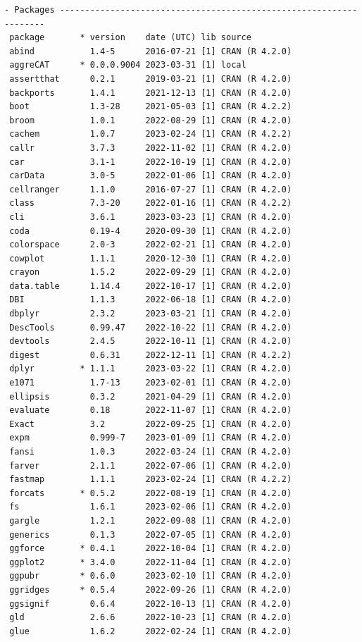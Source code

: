 \documentclass[article]{jss}
\begin{document}
\begin{tcolorbox}[enhanced jigsaw, left=2mm, opacityback=0, leftrule=.75mm, arc=.35mm, rightrule=.15mm, colframe=quarto-callout-color-frame, bottomrule=.15mm, breakable, toprule=.15mm, colback=white]
\begin{verbatim}
- Packages -------------------------------------------------------------------
 package       * version    date (UTC) lib source
 abind           1.4-5      2016-07-21 [1] CRAN (R 4.2.0)
 aggreCAT      * 0.0.0.9004 2023-03-31 [1] local
 assertthat      0.2.1      2019-03-21 [1] CRAN (R 4.2.0)
 backports       1.4.1      2021-12-13 [1] CRAN (R 4.2.0)
 boot            1.3-28     2021-05-03 [1] CRAN (R 4.2.2)
 broom           1.0.1      2022-08-29 [1] CRAN (R 4.2.0)
 cachem          1.0.7      2023-02-24 [1] CRAN (R 4.2.2)
 callr           3.7.3      2022-11-02 [1] CRAN (R 4.2.0)
 car             3.1-1      2022-10-19 [1] CRAN (R 4.2.0)
 carData         3.0-5      2022-01-06 [1] CRAN (R 4.2.0)
 cellranger      1.1.0      2016-07-27 [1] CRAN (R 4.2.0)
 class           7.3-20     2022-01-16 [1] CRAN (R 4.2.2)
 cli             3.6.1      2023-03-23 [1] CRAN (R 4.2.0)
 coda            0.19-4     2020-09-30 [1] CRAN (R 4.2.0)
 colorspace      2.0-3      2022-02-21 [1] CRAN (R 4.2.0)
 cowplot         1.1.1      2020-12-30 [1] CRAN (R 4.2.0)
 crayon          1.5.2      2022-09-29 [1] CRAN (R 4.2.0)
 data.table      1.14.4     2022-10-17 [1] CRAN (R 4.2.0)
 DBI             1.1.3      2022-06-18 [1] CRAN (R 4.2.0)
 dbplyr          2.3.2      2023-03-21 [1] CRAN (R 4.2.0)
 DescTools       0.99.47    2022-10-22 [1] CRAN (R 4.2.0)
 devtools        2.4.5      2022-10-11 [1] CRAN (R 4.2.0)
 digest          0.6.31     2022-12-11 [1] CRAN (R 4.2.2)
 dplyr         * 1.1.1      2023-03-22 [1] CRAN (R 4.2.0)
 e1071           1.7-13     2023-02-01 [1] CRAN (R 4.2.0)
 ellipsis        0.3.2      2021-04-29 [1] CRAN (R 4.2.0)
 evaluate        0.18       2022-11-07 [1] CRAN (R 4.2.0)
 Exact           3.2        2022-09-25 [1] CRAN (R 4.2.0)
 expm            0.999-7    2023-01-09 [1] CRAN (R 4.2.0)
 fansi           1.0.3      2022-03-24 [1] CRAN (R 4.2.0)
 farver          2.1.1      2022-07-06 [1] CRAN (R 4.2.0)
 fastmap         1.1.1      2023-02-24 [1] CRAN (R 4.2.2)
 forcats       * 0.5.2      2022-08-19 [1] CRAN (R 4.2.0)
 fs              1.6.1      2023-02-06 [1] CRAN (R 4.2.0)
 gargle          1.2.1      2022-09-08 [1] CRAN (R 4.2.0)
 generics        0.1.3      2022-07-05 [1] CRAN (R 4.2.0)
 ggforce       * 0.4.1      2022-10-04 [1] CRAN (R 4.2.0)
 ggplot2       * 3.4.0      2022-11-04 [1] CRAN (R 4.2.0)
 ggpubr        * 0.6.0      2023-02-10 [1] CRAN (R 4.2.0)
 ggridges      * 0.5.4      2022-09-26 [1] CRAN (R 4.2.0)
 ggsignif        0.6.4      2022-10-13 [1] CRAN (R 4.2.0)
 gld             2.6.6      2022-10-23 [1] CRAN (R 4.2.0)
 glue            1.6.2      2022-02-24 [1] CRAN (R 4.2.0)

\end{verbatim}
\end{tcolorbox}
\end{document}
